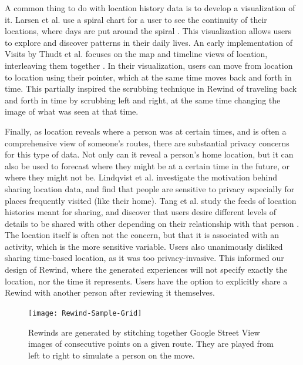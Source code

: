 \documentclass{sigchi}
\begin{document}
A common thing to do with location history data is to develop a visualization of it. Larsen et al. use a spiral chart for a user to see the continuity of their locations, where days are put around the spiral \cite{larsen2013qs}. This visualization allows users to explore and discover patterns in their daily lives. An early implementation of Visits by Thudt et al. focuses on the map and timeline views of location, interleaving them together \cite{thudt2013visits}. In their visualization, users can move from location to location using their pointer, which at the same time moves back and forth in time. This partially inspired the scrubbing technique in Rewind of traveling back and forth in time by scrubbing left and right, at the same time changing the image of what was seen at that time.
 
Finally, as location reveals where a person was at certain times, and is often a comprehensive view of someone's routes, there are substantial privacy concerns for this type of data. Not only can it reveal a person's home location, but it can also be used to forecast where they might be at a certain time in the future, or where they might not be. Lindqvist et al. \cite{lindqvist2011m} investigate the motivation behind sharing location data, and find that people are sensitive to privacy especially for places frequently visited (like their home). Tang et al. study the feeds of location histories meant for sharing, and discover that users desire different levels of details to be shared with other depending on their relationship with that person \cite{tang2011understanding}. The location itself is often not the concern, but that it is associated with an activity, which is the more sensitive variable. Users also unanimously disliked sharing time-based location, as it was too privacy-invasive. This informed our design of Rewind, where the generated experiences will not specify exactly the location, nor the time it represents. Users have the option to explicitly share a Rewind with another person after reviewing it themselves.

\begin{figure}[h]
   \centering
     \texttt{[image: Rewind-Sample-Grid]}
     \caption{Rewinds are generated by stitching together Google Street View images of consecutive points on a given route. They are played from left to right to simulate a person on the move.}
     \label{fig:rewinds}
\end{figure}
\end{document}
